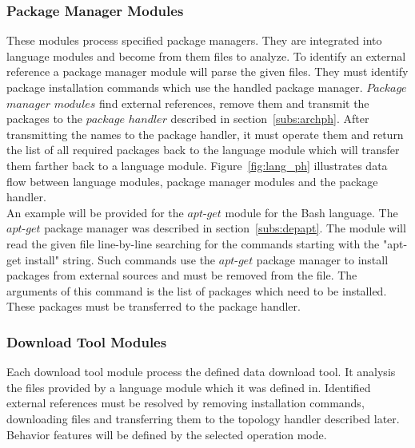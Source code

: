 \subsubsection{Package Manager Modules} \label{subs:archpmm}
These modules process specified package managers.
They are integrated into language modules and become from them files to analyze.
To identify an external reference a package manager module will parse the given files. 
They must identify package installation commands which use the handled package manager.
$Package$ $manager$ $modules$ find external references, remove them and transmit the packages to the $package$ $handler$ described in section~\ref{subs:archph}.
After transmitting the names to the package handler, it must operate them and return the list of all required packages back to the language module which will transfer them farther back to a language module.
Figure~\ref{fig:lang_ph} illustrates data flow between language modules, package manager modules and the package handler.\\
An example will be provided for the $apt$-$get$ module for the Bash language.
The $apt$-$get$ package manager was described in section~\ref{subs:depapt}.
The module will read the given file line-by-line searching for the commands starting with the "apt-get install" string.
Such commands use the $apt$-$get$ package manager to install packages from external sources and must be removed from the file.
The arguments of this command is the list of packages which need to be installed.
These packages must be transferred to the package handler.


\subsubsection{Download Tool Modules}
Each download tool module process the defined data download tool.
It analysis the files provided by a language module which it was defined in.
Identified external references must be resolved by removing installation commands, downloading files and transferring them to the topology handler described later.
Behavior features will be defined by the selected operation mode.

